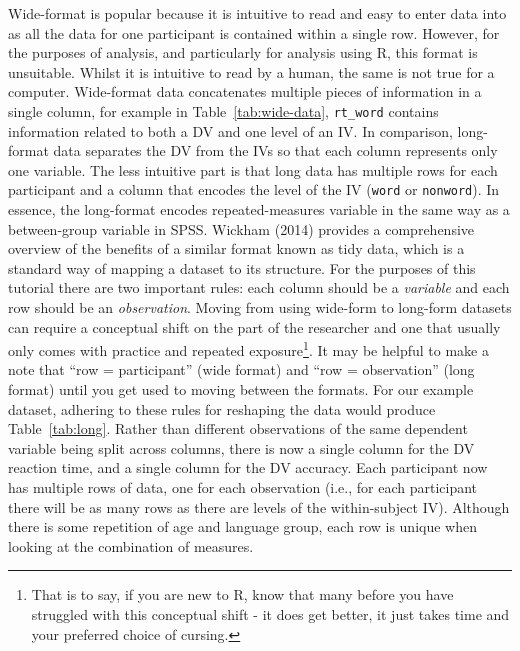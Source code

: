 \documentclass[
  english,
  doc,floatsintext]{apa6}
\begin{document}
Wide-format is popular because it is intuitive to read and easy to enter data into as all the data for one participant is contained within a single row. However, for the purposes of analysis, and particularly for analysis using R, this format is unsuitable. Whilst it is intuitive to read by a human, the same is not true for a computer. Wide-format data concatenates multiple pieces of information in a single column, for example in Table~\ref{tab:wide-data}, \texttt{rt\_word} contains information related to both a DV and one level of an IV. In comparison, long-format data separates the DV from the IVs so that each column represents only one variable. The less intuitive part is that long data has multiple rows for each participant and a column that encodes the level of the IV (\texttt{word} or \texttt{nonword}). In essence, the long-format encodes repeated-measures variable in the same way as a between-group variable in SPSS. Wickham (2014) provides a comprehensive overview of the benefits of a similar format known as tidy data, which is a standard way of mapping a dataset to its structure. For the purposes of this tutorial there are two important rules: each column should be a \emph{variable} and each row should be an \emph{observation}.
Moving from using wide-form to long-form datasets can require a conceptual shift on the part of the researcher and one that usually only comes with practice and repeated exposure\footnote{That is to say, if you are new to R, know that many before you have struggled with this conceptual shift - it does get better, it just takes time and your preferred choice of cursing.}. It may be helpful to make a note that ``row = participant'' (wide format) and ``row = observation'' (long format) until you get used to moving between the formats. For our example dataset, adhering to these rules for reshaping the data would produce Table~\ref{tab:long}. Rather than different observations of the same dependent variable being split across columns, there is now a single column for the DV reaction time, and a single column for the DV accuracy. Each participant now has multiple rows of data, one for each observation (i.e., for each participant there will be as many rows as there are levels of the within-subject IV). Although there is some repetition of age and language group, each row is unique when looking at the combination of measures.
\end{document}

